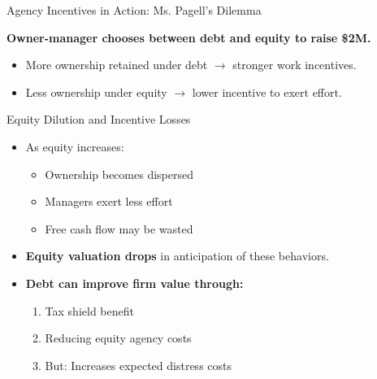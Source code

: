 \begin{frame}{Agency Incentives in Action: Ms. Pagell's Dilemma}
	
	\textbf{Owner-manager chooses between debt and equity to raise \$2M.}
	
	\begin{itemize}
		\item More ownership retained under debt $\rightarrow$ stronger work incentives.
		\item Less ownership under equity $\rightarrow$ lower incentive to exert effort.
	\end{itemize}
	
	\vspace{0.3cm}
	\begin{table}
		\centering
	\end{table}
	
\end{frame}

\begin{frame}{Equity Dilution and Incentive Losses}
	
	\begin{itemize}
		\item As equity increases:
		\begin{itemize}
			\item Ownership becomes dispersed
			\item Managers exert less effort
			\item Free cash flow may be wasted
		\end{itemize}
		
		\item \textbf{Equity valuation drops} in anticipation of these behaviors.
		
		\item \textbf{Debt can improve firm value through:}
		\begin{enumerate}
			\item Tax shield benefit
			\item Reducing equity agency costs
			\item But: Increases expected distress costs
		\end{enumerate}
	\end{itemize}
	
\end{frame}

